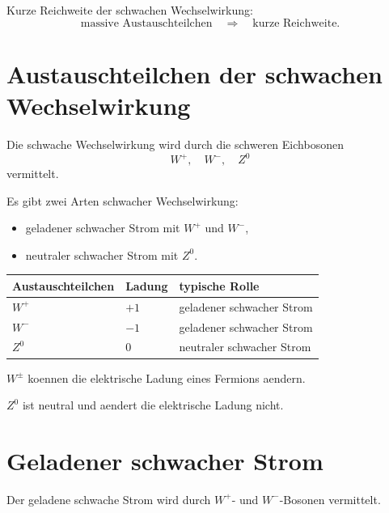 \begin{examtipbox}
Kurze Reichweite der schwachen Wechselwirkung:
\[
    \text{massive Austauschteilchen}
    \quad\Rightarrow\quad
    \text{kurze Reichweite}.
\]
\end{examtipbox}

\section{Austauschteilchen der schwachen Wechselwirkung}

\begin{definitionbox}
Die schwache Wechselwirkung wird durch die schweren Eichbosonen
\[
    W^+,\quad W^-,\quad Z^0
\]
vermittelt.
\end{definitionbox}

\begin{conceptbox}
Es gibt zwei Arten schwacher Wechselwirkung:
\begin{itemize}
    \item geladener schwacher Strom mit $W^+$ und $W^-$,
    \item neutraler schwacher Strom mit $Z^0$.
\end{itemize}
\end{conceptbox}

\begin{center}
\begin{tabular}{|p{4.0cm}|p{4.0cm}|p{5.2cm}|}
\hline
Austauschteilchen & Ladung & typische Rolle \\
\hline
$W^+$ & $+1$ & geladener schwacher Strom \\
\hline
$W^-$ & $-1$ & geladener schwacher Strom \\
\hline
$Z^0$ & $0$ & neutraler schwacher Strom \\
\hline
\end{tabular}
\end{center}

\begin{examtipbox}
$W^\pm$ koennen die elektrische Ladung eines Fermions aendern.

$Z^0$ ist neutral und aendert die elektrische Ladung nicht.
\end{examtipbox}

\section{Geladener schwacher Strom}

Der geladene schwache Strom wird durch $W^+$- und $W^-$-Bosonen vermittelt.

